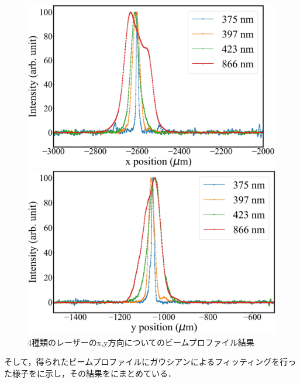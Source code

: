 \begin{figure}[h]
	\begin{center}
	\begin{minipage}{0.48\linewidth}
		\includegraphics[width = 0.8\columnwidth]{./experimental_setup/figure/AllLaserXpos.jpg}
	\end{minipage}
	\begin{minipage}{0.48\linewidth}
		\begin{center}
		\includegraphics[width = 0.8\columnwidth]{./experimental_setup/figure/AllLaserYpos.jpg}
		\end{center}
	\end{minipage}
	\caption{4種類のレーザーのx,y方向についてのビームプロファイル結果}
	\label{fig:AllLaserBeamProfile}
	\end{center}
\end{figure}

そして，得られたビームプロファイルにガウシアンによるフィッティングを行った様子をに示し，その結果をにまとめている．

